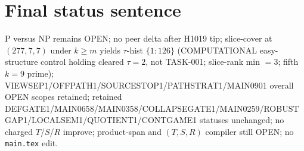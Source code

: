 \documentclass[11pt]{article}
\begin{document}
\section*{Final status sentence}
P versus NP remains OPEN; no peer delta after H1019 tip; slice-cover at $(277,7,7)$ under $k{\ge}m$ yields $\tau$-hist $\{1{:}126\}$ (COMPUTATIONAL easy-structure control holding cleared $\tau{=}2$, not TASK-001; slice-rank min $=3$; fifth $k{=}9$ prime); VIEWSEP1/OFFPATH1/SOURCESTOP1/PATHSTRAT1/MAIN0901 overall OPEN scopes retained; retained DEFGATE1/MAIN0658/MAIN0358/COLLAPSEGATE1/MAIN0259/ROBUSTGAP1/LOCALSEM1/QUOTIENT1/CONTGAME1 statuses unchanged; no charged $T$/$S$/$R$ improve; product-span and $(T,S,R)$ compiler still OPEN; no \texttt{main.tex} edit.
\end{document}
